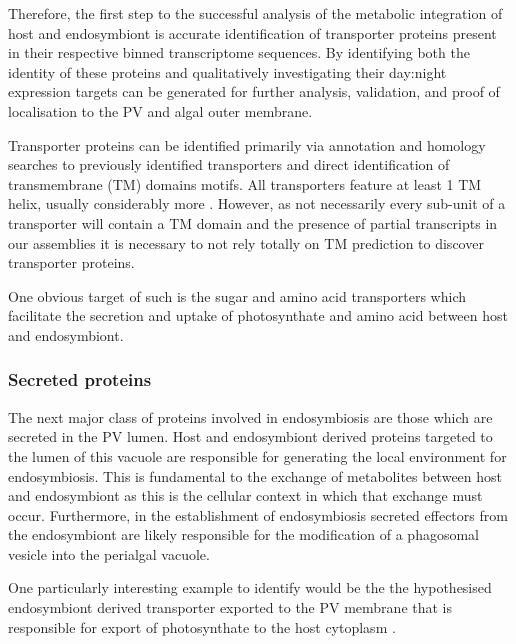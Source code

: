 Therefore, the first step to the successful analysis of the metabolic
integration of host and endosymbiont is accurate identification of
transporter proteins present in their respective binned transcriptome
sequences.   By identifying both the identity of these proteins 
and qualitatively investigating their day:night expression
targets can be generated for further analysis, validation, and 
proof of localisation to the PV and algal outer
membrane.  


Transporter proteins can be identified
primarily via annotation and homology searches to previously
identified transporters \citep{Saier2006,Saier2009,Saier2014} 
and direct identification of transmembrane (TM) domains motifs. 
All transporters feature at least 1 TM helix, usually considerably
more \citep{VonHeijne2006}.  However, as not necessarily every sub-unit of
a transporter will contain a TM domain and the presence of partial transcripts
in our assemblies it is necessary to not rely totally on TM prediction to discover
transporter proteins.

One obvious target of such is the sugar and amino acid transporters which facilitate the
secretion and uptake of photosynthate and amino acid between host and endosymbiont.

\subsubsection{Secreted proteins}

The next major class of proteins involved in endosymbiosis
are those which are secreted in the PV lumen. 
Host and endosymbiont derived proteins targeted to the lumen of
this vacuole are responsible for generating the local environment
for endosymbiosis.  This is fundamental to the exchange of metabolites
between host and endosymbiont as this is the cellular context 
in which that exchange must occur.  Furthermore, in the establishment
of endosymbiosis secreted effectors from the endosymbiont
are likely responsible for the modification of a phagosomal vesicle into 
the perialgal vacuole. 

One particularly interesting example to identify would be the 
the hypothesised endosymbiont derived transporter exported
to the PV membrane that is responsible for export
of photosynthate to the host cytoplasm \citep{Kodama2008}.


